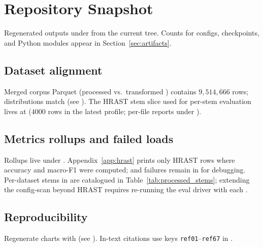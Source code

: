 \section{Repository Snapshot}
\label{sec:repository}

Regenerated outputs under  from the current  tree. Counts for configs, checkpoints, and Python modules appear in Section~\ref{sec:artifacts}.

\subsection{Dataset alignment}
Merged corpus Parquet (processed vs.\ transformed ) contains $9{,}514{,}666$ rows;  distributions match (see ). The HRAST stem slice used for per-stem evaluation lives at  ($4000$ rows in the latest profile; per-file reports under ).

\subsection{Metrics rollups and failed loads}
Rollups live under . Appendix~\ref{app:hrast} prints only HRAST rows where accuracy and macro-F1 were computed;  and  failures remain in  for debugging. Per-dataset stems in  are catalogued in Table~\ref{tab:processed_stems}; extending the config-scan beyond HRAST requires re-running the eval driver with each .

\subsection{Reproducibility}
Regenerate charts with  (see ). In-text citations use keys \texttt{ref01}--\texttt{ref67} in .
